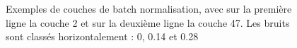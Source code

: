 \documentclass[12pt]{article}
\begin{document}
\begin{figure}[htb]
  \hfill
  \hfill
  \hfill
  \caption{Exemples de couches de batch normalisation, avec sur la première ligne la couche 2 et sur la deuxième ligne la couche 47. Les bruits sont classés horizontalement : 0, 0.14 et 0.28}\label{fig:occlus_dynamic}
\end{figure}
\end{document}
